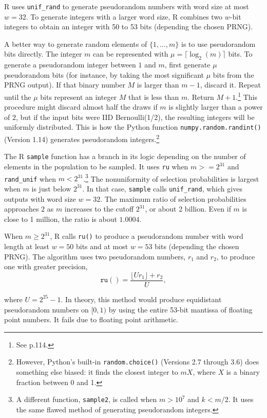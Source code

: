 \documentclass[12pt]{article}
\begin{document}
R uses \texttt{unif\_rand} to generate pseudorandom numbers with word size at most $w=32$.
To generate integers with a larger word size, R combines two $w$-bit integers to obtain an integer with 50 to 53 bits (depending the chosen PRNG). 

A better way to generate random elements of $\{1, \dots, m\}$ is to use pseudorandom bits directly. 
The integer $m$ can be represented with $\mu = \lceil \log_2(m) \rceil$ bits. 
To generate a pseudorandom integer between $1$ and $m$, first generate $\mu$ pseudorandom bits (for instance, by taking the most significant $\mu$ bits from the PRNG output).  
If that binary number $M$ is larger than $m-1$, discard it.
Repeat until the $\mu$ bits represent an integer $M$ that is less than $m$. 
Return $M+1$.\footnote{%
   See \citet{knuth_art_1997} p.114.
}
This procedure might discard almost half the draws if $m$ is slightly larger than a power of $2$,
but if the input bits were IID Bernoulli(1/2), the resulting integers will be uniformly distributed.
This is how the Python function \texttt{numpy.random.randint()} (Version 1.14) generates pseudorandom integers.\footnote{%
However, Python's built-in \texttt{random.choice()} (Versions 2.7 through 3.6) does something else biased: it finds the closest integer to $mX$, where $X$ is a binary fraction between 0 and 1.
}

The R \texttt{sample} function has a branch in its logic depending on the number of elements
in the population to be sampled. 
It uses \texttt{ru} when $m >= 2^{31}$ and \texttt{rand\_unif} when $m < 2^{31}$.\footnote{
A different function, \texttt{sample2}, is called when $m > 10^7$ and $k < m/2$.
It uses the same flawed method of generating pseudorandom integers.
}
The nonuniformity of selection probabilities is largest when $m$ is just below $2^{31}$. 
In that case, \texttt{sample} calls \texttt{unif\_rand}, which gives outputs with word size $w=32$. 
The maximum ratio of selection probabilities approaches $2$ as $m$ increases to the cutoff $2^{31}$, or about 2 billion. 
Even if $m$ is close to 1 million, the ratio is about $1.0004$.

When $m \ge 2^{31}$, R calls \texttt{ru()}  to produce a pseudorandom number with word length at least $w=50$ bits and at most $w=53$ bits (depending the chosen PRNG). 
The algorithm uses two pseudorandom numbers, $r_1$ and $r_2$, to produce one with greater precision,
$$ \texttt{ru}() = \frac{\lfloor U r_1 \rfloor + r_2}{U},$$

\noindent where $U = 2^{25}-1$.
In theory, this method would produce equidistant pseudorandom numbers on $[0, 1)$ by using the entire 53-bit mantissa of floating point numbers.
It fails due to floating point arithmetic.
\end{document}
